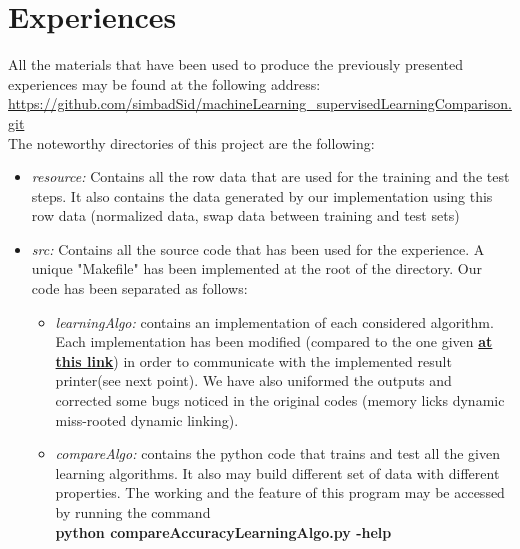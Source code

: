 \documentclass[12pt]{article}											%
\begin{document}
\section{Experiences} \label{section_experiences}
All the materials that have been used to produce the previously presented experiences may be found at the following address:\\
\href{https://github.com/simbadSid/machineLearning_supervisedLearningComparison.git}{https://github.com/simbadSid/machineLearning\_supervisedLearningComparison.git}\\
The noteworthy directories of this project are the following:
\begin{itemize}
	\item \emph{resource:}   Contains all the row data that are used for the training and the test steps.   It also contains the data generated by our implementation using this row data (normalized data, swap data between training and test sets)


	\item \emph{src:}   Contains all the source code that has been used for the experience.   A unique "Makefile" has been implemented at the root of the directory.   Our code has been separated as follows:
    \begin{itemize}
		\item \emph{learningAlgo:} contains an implementation of each considered algorithm.   Each implementation has been modified (compared to the one given \href{http://ama.liglab.fr/~amini/DataCode.html}{\textbf{at this link}}) in order to communicate with the implemented result printer(see next point).   We have also uniformed the outputs and corrected some bugs noticed in the original codes (memory licks dynamic miss-rooted dynamic linking). 
		\item \emph{compareAlgo:}   contains the python code that trains and test all the given learning algorithms.   It also may build different set of data with different properties.   The working and the feature of this program may be accessed by running the command \\ \textbf{python compareAccuracyLearningAlgo.py -help}\\
    \end{itemize}
\end{itemize}
\end{document}
